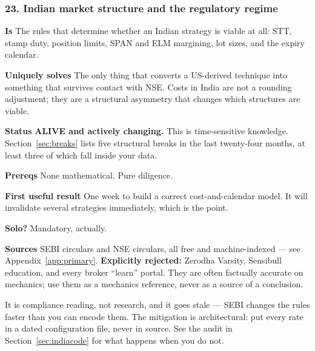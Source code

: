 \documentclass[11pt,a4paper]{article}
\newcommand{\alv}[1]{\textcolor{alive}{\textbf{#1}}}
\newcommand{\fitem}[1]{\par\smallskip\noindent\textbf{#1} }
\begin{document}
\subsubsection{23. Indian market structure and the regulatory regime}
\fitem{Is}The rules that determine whether an Indian strategy is viable at all:
STT, stamp duty, position limits, SPAN and ELM margining, lot sizes, and the
expiry calendar.
\fitem{Uniquely solves}The only thing that converts a US-derived technique into
something that survives contact with NSE. Costs in India are not a rounding
adjustment; they are a structural asymmetry that changes which structures are viable.
\fitem{Status}\alv{ALIVE and actively changing.} This is time-sensitive
knowledge. Section~\ref{sec:breaks} lists five structural breaks in the last
twenty-four months, at least three of which fall inside your data.
\fitem{Prereqs}None mathematical. Pure diligence.
\fitem{First useful result}One week to build a correct cost-and-calendar model.
It will invalidate several strategies immediately, which is the point.
\fitem{Solo?}Mandatory, actually.
\fitem{Sources}SEBI circulars and NSE circulars, all free and machine-indexed ---
see Appendix~\ref{app:primary}. \textbf{Explicitly rejected:} Zerodha Varsity,
Sensibull education, and every broker ``learn'' portal. They are often factually
accurate on mechanics; use them as a mechanics reference, never as a source of a
conclusion.

\begin{waste}
It is compliance reading, not research, and it goes stale --- SEBI changes the
rules faster than you can encode them. The mitigation is architectural: put every
rate in a dated configuration file, never in source. See the audit in
Section~\ref{sec:indiacode} for what happens when you do not.
\end{waste}
\end{document}
